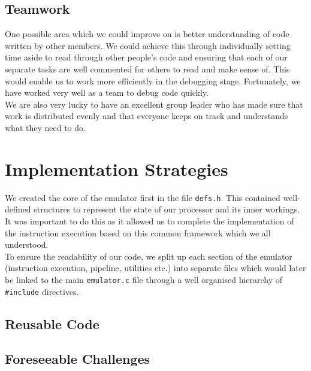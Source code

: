 \documentclass[11pt]{article}
\begin{document}
\subsection{Teamwork}
One possible area which we could improve on is better understanding of code written by other members. We could achieve this through individually setting time aside to read through other people's code and ensuring that each of our separate tasks are well commented for others to read and make sense of. This would enable us to work more efficiently in the debugging stage. Fortunately, we have worked very well as a team to debug code quickly.\\

We are also very lucky to have an excellent group leader who has made sure that work is distributed evenly and that everyone keeps on track and understands what they need to do.

\section{Implementation Strategies}
We created the core of the emulator first in the file \texttt{defs.h}. This contained well-defined structures to represent the state of our processor and its inner workings. It was important to do this as it allowed us to complete the implementation of the instruction execution based on this common framework which we all understood.\\

To ensure the readability of our code, we split up each section of the emulator (instruction execution, pipeline, utilities etc.) into separate files which would later be linked to the main \texttt{emulator.c} file through a well organised hierarchy of \texttt{{\#}include} directives.

\subsection{Reusable Code}


\subsection{Foreseeable Challenges}
\end{document}
